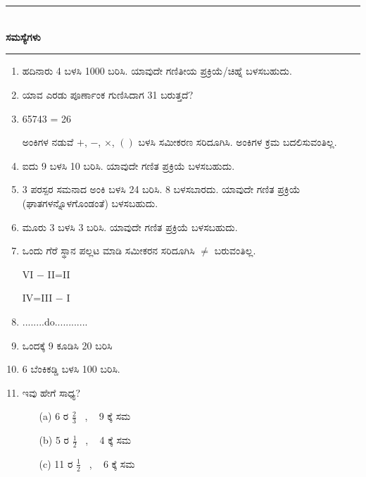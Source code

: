 \chapter[ಅಧ್ಯಾಯ 4]{}\label{chap4}

\begin{center}
\rule{5cm}{1pt}\\[5pt]
{\Large\bfseries ಸಮಸ್ಯೆಗಳು}\\[3pt]
\rule{5cm}{1pt}
\end{center}

\smallskip
\begin{enumerate}
\renewcommand{\labelenumi}{\bf\theenumi.}
\itemsep=5pt

\item ಹದಿನಾರು 4 ಬಳಸಿ 1000 ಬರಿಸಿ. ಯಾವುದೇ ಗಣಿತೀಯ ಪ್ರಕ್ರಿಯೆ/ಚಿಹ್ನೆ ಬಳಸಬಹುದು.

\item ಯಾವ ಎರಡು ಪೂರ್ಣಾಂಕ ಗುಣಿಸಿದಾಗ 31 ಬರುತ್ತದೆ?

\item 65743 = 26

ಅಂಕಿಗಳ ನಡುವೆ $+$, $-$, $\times$, $()$ ಬಳಸಿ ಸಮೀಕರಣ ಸರಿದೂಗಿಸಿ. ಅಂಕಿಗಳ ಕ್ರಮ ಬದಲಿಸುವಂತಿಲ್ಲ.

\item ಐದು 9 ಬಳಸಿ 10 ಬರಿಸಿ. ಯಾವುದೇ ಗಣಿತ ಪ್ರಕ್ರಿಯೆ ಬಳಸಬಹುದು. 

\item 3 ಪರಸ್ಪರ ಸಮನಾದ ಅಂಕಿ ಬಳಸಿ 24 ಬರಿಸಿ. 8 ಬಳಸಬಾರದು. ಯಾವುದೇ ಗಣಿತ ಪ್ರಕ್ರಿಯೆ (ಘಾತಗಳನ್ನೊಳಗೊಂಡಂತೆ) ಬಳಸಬಹುದು.

\item ಮೂರು 3 ಬಳಸಿ 3 ಬರಿಸಿ. ಯಾವುದೇ ಗಣಿತ ಪ್ರಕ್ರಿಯೆ ಬಳಸಬಹುದು.

\item ಒಂದು ಗೆರೆ ಸ್ಥಾನ ಪಲ್ಲಟ ಮಾಡಿ ಸಮೀಕರನ ಸರಿದೂಗಿಸಿ $\neq$ ಬರುವಂತಿಲ್ಲ. 

VI $-$ II=II

IV=III $-$ I

\item ........do............

\item ಒಂದಕ್ಕೆ 9 ಕೂಡಿಸಿ 20 ಬರಿಸಿ

\item 6 ಬೆಂಕಿಕಡ್ಡಿ  ಬಳಸಿ 100 ಬರಿಸಿ. 

\item ಇವು ಹೇಗೆ ಸಾಧ್ಯ?
\begin{itemize}
\item[(a)] 6 ರ $\frac{2}{3}$~ , ~ 9 ಕ್ಕೆ ಸಮ 
\item[(b)] 5 ರ $\frac{1}{2}$~ , ~ 4 ಕ್ಕೆ ಸಮ
\item[(c)] 11 ರ $\frac{1}{2}$~ , ~ 6 ಕ್ಕೆ ಸಮ
\end{itemize}


\end{enumerate}
